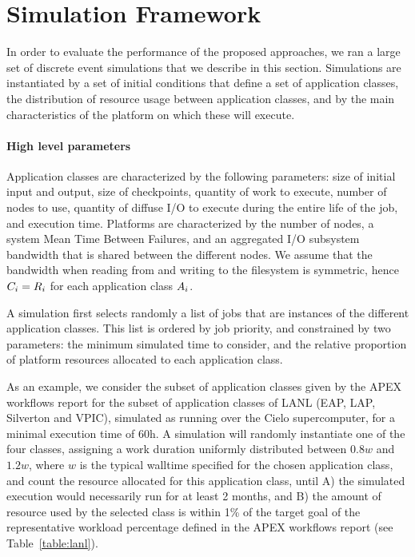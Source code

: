 
\section{Simulation Framework}
\label{sec:simulator}

In order to evaluate the performance of the proposed approaches, we ran
a large set of discrete event simulations that we describe in this
section. Simulations are instantiated by a set of initial conditions
that define a set of application classes, the distribution of
resource usage between application classes, and by
the main characteristics of the platform on which these will execute.

\paragraph*{High level parameters}
Application classes are characterized by the following parameters:
size of initial input and output, size of checkpoints, quantity of
work to execute, number of nodes to use, quantity of diffuse I/O to
execute during the entire life of the job, and execution time.
Platforms are characterized by the number of nodes, a system Mean Time
Between Failures, and an aggregated I/O subsystem bandwidth that is
shared between the different nodes. We assume that the bandwidth when
reading from and writing to the filesystem is symmetric, hence
$C_{i}=R_{i}$ for each application class $A_{i}$.

A simulation first selects randomly a list of jobs that are instances
of the different application classes. This list is ordered by job
priority, and constrained by two parameters: the minimum simulated
time to consider, and the relative proportion of platform resources
allocated to each application class.

As an example, we consider the subset of application classes given by
the APEX workflows report for the subset of application classes of
LANL (EAP, LAP, Silverton and VPIC), simulated as running over the
Cielo supercomputer, for a minimal execution time of 60h. A simulation
will randomly instantiate one of the four classes, assigning a work
duration uniformly distributed between $0.8w$ and $1.2w$, where $w$ is
the typical walltime specified for the chosen application class, and
count the resource allocated for this application class, until A) the
simulated execution would necessarily run for at least 2 months, and B) the
amount of resource used by the selected class is within 1\% of the
target goal of the representative workload percentage defined in the
APEX workflows report (see Table~\ref{table:lanl}).

